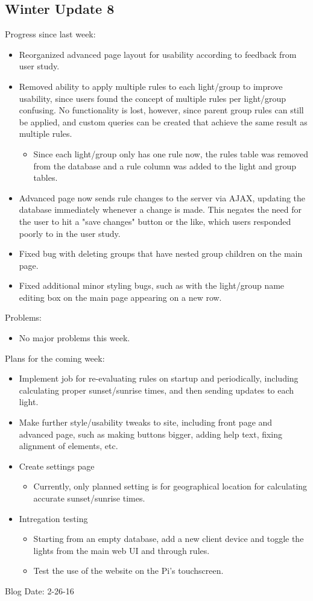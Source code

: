 \subsection{Winter Update 8}
Progress since last week:
\begin{itemize}
\item Reorganized advanced page layout for usability according to feedback from user study.
\item Removed ability to apply multiple rules to each light/group to improve usability, since users found the concept of multiple rules per light/group confusing.  No functionality is lost, however, since parent group rules can still be applied, and custom queries can be created that achieve the same result as multiple rules.
\begin{itemize}
\item Since each light/group only has one rule now, the rules table was removed from the database and a rule column was added to the light and group tables.
\end{itemize}
\item Advanced page now sends rule changes to the server via AJAX, updating the database immediately whenever a change is made.  This negates the need for the user to hit a "save changes" button or the like, which users responded poorly to in the user study.
\item Fixed bug with deleting groups that have nested group children on the main page.
\item Fixed additional minor styling bugs, such as with the light/group name editing box on the main page appearing on a new row.
\end{itemize}
Problems:
\begin{itemize}
\item No major problems this week.
\end{itemize}
Plans for the coming week: 
\begin{itemize}
\item Implement job for re-evaluating rules on startup and periodically, including calculating proper sunset/sunrise times, and then sending updates to each light.
\item Make further style/usability tweaks to site, including front page and advanced page, such as making buttons bigger, adding help text, fixing alignment of elements, etc.
\item Create settings page
\begin{itemize}
\item Currently, only planned setting is for geographical location for calculating accurate sunset/sunrise times.
\end{itemize}
\item Intregation testing
\begin{itemize}
\item Starting from an empty database, add a new client device and toggle the lights from the main web UI and through rules.
\item Test the use of the website on the Pi's touchscreen.
\end{itemize}
\end{itemize}
Blog Date: 2-26-16

